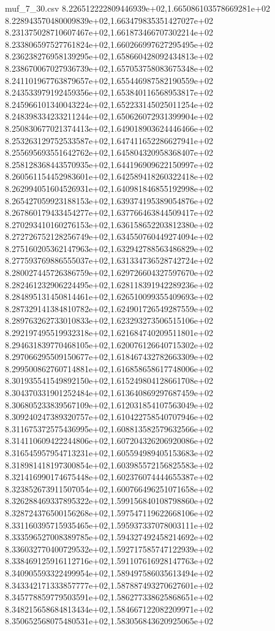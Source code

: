 \begin{filecontents*}{muf_7_30.csv}
8.226512222809446939e+02,1.665086103578669281e+02
8.228943570480009839e+02,1.663479835351427027e+02
8.231375028710607467e+02,1.661873466707302214e+02
8.233806597527761824e+02,1.660266997627295495e+02
8.236238276958139295e+02,1.658660428092434813e+02
8.238670067027936739e+02,1.657053758083675348e+02
8.241101967763879657e+02,1.655446987582190559e+02
8.243533979192459356e+02,1.653840116568953817e+02
8.245966101340043224e+02,1.652233145025011254e+02
8.248398334233211244e+02,1.650626072931399904e+02
8.250830677021374413e+02,1.649018903624446466e+02
8.253263129752533587e+02,1.647411652286627941e+02
8.255695693551642762e+02,1.645804320958368407e+02
8.258128368443570935e+02,1.644196909622150997e+02
8.260561154452983601e+02,1.642589418260322418e+02
8.262994051604526931e+02,1.640981846855192998e+02
8.265427059923188153e+02,1.639374195389054876e+02
8.267860179433454277e+02,1.637766463844509417e+02
8.270293410160276153e+02,1.636158652203812380e+02
8.272726752128256749e+02,1.634550760449274094e+02
8.275160205362147963e+02,1.632942788563486829e+02
8.277593769886555037e+02,1.631334736528742724e+02
8.280027445726386759e+02,1.629726604327597670e+02
8.282461232906224495e+02,1.628118391942289236e+02
8.284895131450814461e+02,1.626510099355409693e+02
8.287329141384810782e+02,1.624901726549287559e+02
8.289763262733010833e+02,1.623293273506515106e+02
8.292197495519932318e+02,1.621684740209511801e+02
8.294631839770468105e+02,1.620076126640715302e+02
8.297066295509150677e+02,1.618467432782663309e+02
8.299500862760714881e+02,1.616858658617748006e+02
8.301935541549892150e+02,1.615249804128661708e+02
8.304370331901252484e+02,1.613640869297687459e+02
8.306805233839567109e+02,1.612031854107563049e+02
8.309240247389320757e+02,1.610422758540707946e+02
8.311675372575436995e+02,1.608813582579632566e+02
8.314110609422244806e+02,1.607204326206920086e+02
8.316545957954713231e+02,1.605594989405153683e+02
8.318981418197300854e+02,1.603985572156825583e+02
8.321416990174675448e+02,1.602376074444655387e+02
8.323852673911507054e+02,1.600766496251071658e+02
8.326288469337895322e+02,1.599156840108798860e+02
8.328724376500156268e+02,1.597547119622668106e+02
8.331160395715935465e+02,1.595937337078003111e+02
8.333596527008389785e+02,1.594327492458214692e+02
8.336032770400729532e+02,1.592717585747122939e+02
8.338469125916112716e+02,1.591107616928147763e+02
8.340905593322499954e+02,1.589497586035613494e+02
8.343342171333857777e+02,1.587887493270627601e+02
8.345778859779503591e+02,1.586277338625868651e+02
8.348215658684813434e+02,1.584667122082209971e+02
8.350652568075480531e+02,1.583056843620925065e+02

\end{filecontents*}
